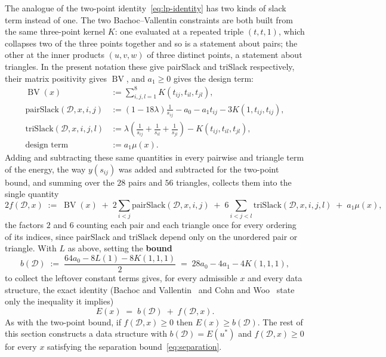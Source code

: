 \documentclass[11pt]{article}
\theoremstyle{definition}
\theoremstyle{remark}
\newcommand{\energy}{E}
\newcommand{\BV}{\operatorname{BV}}
\begin{document}
The analogue of the two-point identity~\eqref{eq:lp-identity} has two
kinds of slack term instead of one. The two Bachoc--Vallentin constraints
are both built from the same three-point kernel $K$: one evaluated at a
repeated triple $(t,t,1)$, which collapses two of the three points
together and so is a statement about pairs; the other at the inner
products $(u,v,w)$ of three distinct points, a statement about
triangles. In the present notation these give pairSlack and triSlack
respectively, their matrix positivity gives $\BV$, and $a_1\ge0$ gives
the design term:
\begin{align}
  \BV(x) &:= \sum_{i,j,l=1}^{8} K(t_{ij},t_{il},t_{jl}), \\
  \mathrm{pairSlack}(\mathcal{D},x,i,j) &:= (1-18\lambda)\frac{1}{s_{ij}} - a_0 - a_1 t_{ij} - 3K(1,t_{ij},t_{ij}), \\
  \mathrm{triSlack}(\mathcal{D},x,i,j,l) &:= \lambda\left(\frac1{s_{ij}}+\frac1{s_{il}}+\frac1{s_{jl}}\right) - K(t_{ij},t_{il},t_{jl}), \\
  \text{design term} &:= a_1 \mu(x).
\end{align}
Adding and subtracting these same quantities in every pairwise and
triangle term of the energy, the way $y(s_{ij})$ was added and
subtracted for the two-point bound, and summing over the $28$ pairs and
$56$ triangles, collects them into the single quantity
\begin{equation}
  2f(\mathcal{D},x) \;:=\; \BV(x) \;+\; 2\sum_{i<j}\mathrm{pairSlack}(\mathcal{D},x,i,j)
  \;+\; 6\sum_{i<j<l}\mathrm{triSlack}(\mathcal{D},x,i,j,l) \;+\; a_1\mu(x),
\end{equation}
the factors $2$ and $6$ counting each pair and each triangle once for
every ordering of its indices, since $\mathrm{pairSlack}$ and
$\mathrm{triSlack}$ depend only on the unordered pair or triangle.
With $L$ as above, setting the \textbf{bound}
\begin{equation}
  b(\mathcal{D}) \;:=\; \frac{64a_0 - 8L(1) - 8K(1,1,1)}{2} \;=\; 28a_0 - 4a_1 - 4K(1,1,1),
\end{equation}
to collect the leftover constant terms gives, for every admissible $x$
and every data structure, the exact identity (Bachoc and Vallentin~\cite{BV08} and Cohn and
Woo~\cite{CW12} state only the inequality it implies)
\begin{equation}
  \label{eq:main-identity}
  \energy(x) \;=\; b(\mathcal{D}) \;+\; f(\mathcal{D},x).
\end{equation}
As with the two-point bound, if $f(\mathcal{D},x)\ge0$ then
$\energy(x)\ge b(\mathcal{D})$. The rest of this section constructs a data
structure with $b(\mathcal{D})=\energy(u^*)$ and $f(\mathcal{D},x)\ge0$
for every $x$ satisfying the separation bound~\eqref{eq:separation}.
\end{document}
